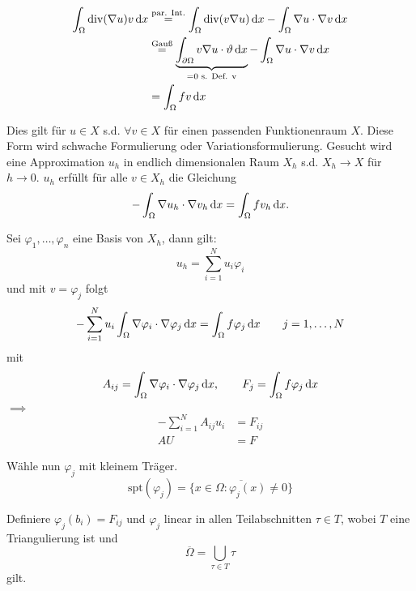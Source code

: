 \begin{align*}
	\int_\Omega \text{div}( \nabla u) v \mathop{}\!\mathrm{d} x
	&\stackrel{\text{par. Int.}}{=} \int_\Omega \text{div}( v \nabla u ) \mathop{}\!\mathrm{d} x -	\int_\Omega \nabla u \cdot \nabla v \mathop{}\!\mathrm{d} x \\
	&\stackrel{\text{Gauß}}{=}  \underbrace{\int_{\partial\Omega}  v \nabla u  \cdot \vartheta \mathop{}\!\mathrm{d} x}_{=0\text{ s. Def. v}} -	\int_\Omega \nabla u \cdot \nabla v \mathop{}\!\mathrm{d} x \\
	&=  \int_\Omega fv \mathop{}\!\mathrm{d} x
\end{align*}

Dies gilt für $u \in X$ s.d. $\forall v\in X$ f\"ur einen passenden Funktionenraum $X$.
Diese Form wird schwache Formulierung oder Variationsformulierung.
\enter
Gesucht wird eine Approximation $u_h$ in endlich dimensionalen Raum $X_h$ s.d. $X_h \to X$ f\"ur $h \to 0$.\enter
$u_h$ erf\"ullt f\"ur alle $v\in X_h$ die Gleichung
\begin{equation*}
	-	\int_\Omega \nabla u_h \cdot \nabla v_h \mathop{}\!\mathrm{d} x = \int_\Omega fv_h \mathop{}\!\mathrm{d} x.
\end{equation*}

Sei $\varphi_1,\dots, \varphi_n$ eine Basis von $X_h$, dann gilt:
\begin{equation*}
	u_h = \displaystyle\sum_{i=1}^N u_i\varphi_i 
\end{equation*}
und mit $v=\varphi_j$ folgt 
\begin{equation*}
	- \displaystyle\sum_{i=1}^N u_i \int_\Omega \nabla \varphi_i \cdot \nabla \varphi_j \mathop{}\!\mathrm{d} x = \int_\Omega f\varphi_j \mathop{}\!\mathrm{d} x \qquad j=1,\dots,N
\end{equation*}
mit 
\begin{align*}
	A_{ij} = \int_\Omega \nabla \varphi_i \cdot \nabla \varphi_j \mathop{}\!\mathrm{d} x, \quad \quad F_j = \int_\Omega f \varphi_j \mathop{}\!\mathrm{d} x
\end{align*}
$\implies$
\begin{align*}
	- \displaystyle\sum_{i=1}^N A_{ij}u_i &= F_{ij}\\
	AU &=F
\end{align*} 

W\"ahle nun $\varphi_j$ mit kleinem Tr\"ager.\enter
\begin{equation*}
	\text{spt}(\varphi_j) = \overline{\Big\{  x \in \Omega: \varphi_j(x) \neq 0 \Big\}}
\end{equation*}


Definiere $\varphi_j(b_i) = F_{ij}$ und $\varphi_j$ linear in allen Teilabschnitten $\tau \in T$, wobei $T$ eine Triangulierung ist und 
\begin{equation*}
	\overline{\Omega} = \bigcup\limits_{\tau\in T}\tau
\end{equation*}
gilt.

